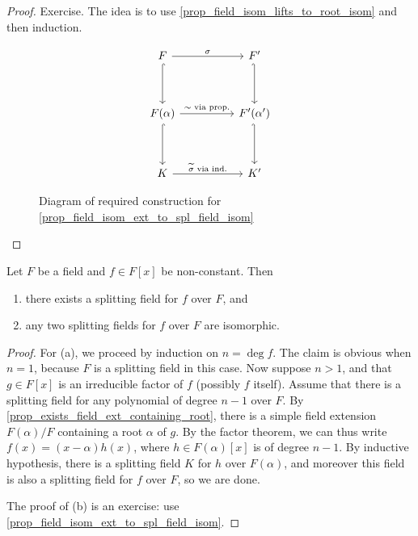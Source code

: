 \begin{proof}
    Exercise. The idea is to use \cref{prop_field_isom_lifts_to_root_isom} and then induction.
    \begin{figure}[h]
        \[
            \begin{tikzcd}
            	F && {F'} \\
            	\\
            	{F(\alpha)} && {F'(\alpha')} \\
            	\\
            	K && {K'}
            	\arrow["{\sigma}", from=1-1, to=1-3]
            	\arrow[hook, from=1-1, to=3-1]
            	\arrow[hook', from=1-3, to=3-3]
            	\arrow["{\sim \text{ via prop.}}", from=3-1, to=3-3]
            	\arrow[hook, from=3-1, to=5-1]
            	\arrow[hook', from=3-3, to=5-3]
            	\arrow["{\widetilde{\sigma} \text{ via ind.}}", from=5-1, to=5-3]
            \end{tikzcd}
        \]
    \caption{Diagram of required construction for \cref{prop_field_isom_ext_to_spl_field_isom}}
    \end{figure}
\end{proof}

\begin{theorem}
    Let $F$ be a field and $f \in F[x]$ be non-constant. Then
    \begin{enumerate}[label=(\alph*)]
        \item there exists a splitting field for $f$ over $F$, and
        \item any two splitting fields for $f$ over $F$ are isomorphic.
    \end{enumerate}
\end{theorem}

\begin{proof}
    For (a), we proceed by induction on $n = \deg{f}$. The claim is obvious when $n = 1$, because $F$ is a splitting field in this case. Now suppose $n > 1$, and that $g \in F[x]$ is an irreducible factor of $f$ (possibly $f$ itself). Assume that there is a splitting field for any polynomial of degree $n - 1$ over $F$. By \cref{prop_exists_field_ext_containing_root}, there is a simple field extension $F(\alpha)/F$ containing a root $\alpha$ of $g$. By the factor theorem, we can thus write $f(x) = (x - \alpha) h(x)$, where $h \in F(\alpha)[x]$ is of degree $n - 1$. By inductive hypothesis, there is a splitting field $K$ for $h$ over $F(\alpha)$, and moreover this field is also a splitting field for $f$ over $F$, so we are done.
    
    The proof of (b) is an exercise: use \cref{prop_field_isom_ext_to_spl_field_isom}.
\end{proof}

